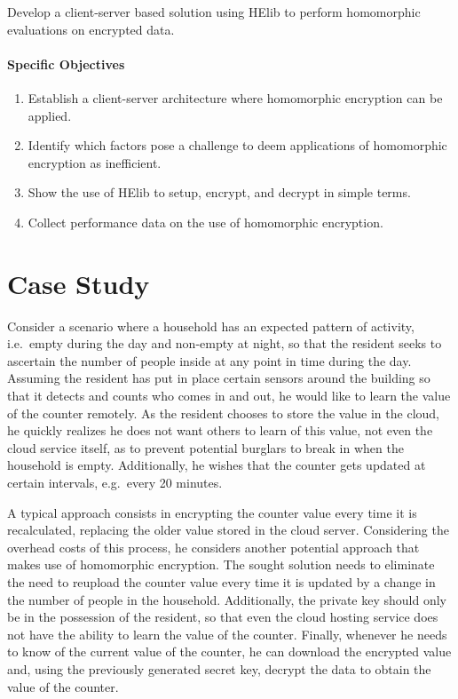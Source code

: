 Develop a client-server based solution using HElib to perform homomorphic evaluations on encrypted data.

\paragraph{Specific Objectives}
\begin{enumerate}
\item Establish a client-server architecture where homomorphic encryption can be applied.
\item Identify which factors pose a challenge to deem applications of homomorphic encryption as inefficient.
\item Show the use of HElib to setup, encrypt, and decrypt in simple terms.
\item Collect performance data on the use of homomorphic encryption.
\end{enumerate}

\section{Case Study}

Consider a scenario where a household has an expected pattern of activity, i.e.\ empty during the day and non-empty at night, so that the resident seeks to ascertain the number of people inside at any point in time during the day. Assuming the resident has put in place certain sensors around the building so that it detects and counts who comes in and out, he would like to learn the value of the counter remotely. As the resident chooses to store the value in the cloud, he quickly realizes he does not want others to learn of this value, not even the cloud service itself, as to prevent potential burglars to break in when the household is empty. Additionally, he wishes that the counter gets updated at certain intervals, e.g.\ every 20 minutes. 

A typical approach consists in encrypting the counter value every time it is recalculated, replacing the older value stored in the cloud server. Considering the overhead costs of this process, he considers another potential approach that makes use of homomorphic encryption. The sought solution needs to eliminate the need to reupload the counter value every time it is updated by a change in the number of people in the household. Additionally, the private key should only be in the possession of the resident, so that even the cloud hosting service does not have the ability to learn the value of the counter. Finally, whenever he needs to know of the current value of the counter, he can download the encrypted value and, using the previously generated secret key, decrypt the data to obtain the value of the counter.

